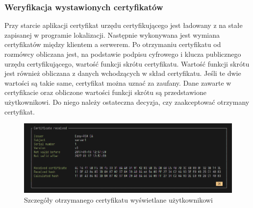 \documentclass{article}
\begin{document}
    \subsubsection{Weryfikacja wystawionych certyfikatów}
      Przy starcie aplikacji certyfikat urzędu certyfikującego jest ładowany z na stałe zapisanej w programie lokalizacji.
      Następnie wykonywana jest wymiana certyfikatów między klientem a serwerem. Po otrzymaniu certyfikatu od rozmówcy
      obliczana jest, na podstawie podpisu cyfrowego i klucza publicznego urzędu certyfikującego, wartość funkcji skrótu
      certyfikatu. Wartość funkcji skrótu jest również obliczana z danych wchodzących w skład certyfikatu. Jeśli te dwie
      wartości są takie same, certyfikat można uznać za zaufany. Dane zawarte w certyfikacie oraz obliczone wartości
      funkcji skrótu są przedstawione użytkownikowi. Do niego należy ostateczna decyzja, czy zaakceptować otrzymany
      certyfikat.
        \begin{figure}[tp]
            \centering
            \includegraphics[scale=0.5]{rezultat_weryfikacji_certyfikatu}
            \caption{Szczegóły otrzymanego certyfikatu wyświetlane użytkownikowi}
            \label{CERTIFICATE_VALIDATION_RESULT}
        \end{figure}
\end{document}
